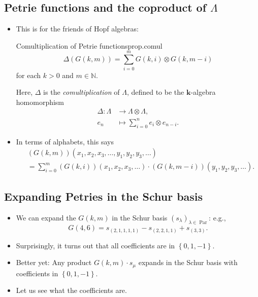 \documentclass[numbers=enddot,12pt,final,onecolumn,notitlepage]{scrartcl}%
\newcommand{\defn}[1]{{\color{darkred}\emph{#1}}}
\newcommand{\0}{\phantom{c}}
\let\sumnonlimits\sum
\renewcommand{\sum}{\sumnonlimits\limits}
\begin{document}
\subsection{Petrie functions and the coproduct of $\Lambda$}

\begin{itemize}
\item This is for the friends of Hopf algebras:%
\begin{proposition}{Comultiplication of Petrie functions}{prop.comul}
\[
\Delta\left(  G\left(  k,m\right)  \right)  =\sum_{i=0}^{m}G\left(
k,i\right)  \otimes G\left(  k,m-i\right)
\]
for each $k>0$ and $m\in\mathbb{N}$.
\end{proposition}

Here, \defn{$\Delta$} is the \defn{comultiplication} of $\Lambda$, defined to
be the $\mathbf{k}$-algebra homomorphism%
\begin{align*}
\Delta:\Lambda &  \rightarrow\Lambda\otimes\Lambda,\\
e_{n}  &  \mapsto\sum_{i=0}^{n}e_{i}\otimes e_{n-i}.
\end{align*}


\item In terms of alphabets, this says%
\begin{align*}
&  \left(  G\left(  k,m\right)  \right)  \left(  x_{1},x_{2},x_{3}%
,\ldots,y_{1},y_{2},y_{3},\ldots\right) \\
&  =\sum_{i=0}^{m}\left(  G\left(  k,i\right)  \right)  \left(  x_{1}%
,x_{2},x_{3},\ldots\right)  \cdot\left(  G\left(  k,m-i\right)  \right)
\left(  y_{1},y_{2},y_{3},\ldots\right)  .
\end{align*}

\end{itemize}

\subsection{Expanding Petries in the Schur basis}

\begin{itemize}
\item We can expand the $G\left(  k,m\right)  $ in the Schur basis $\left(
s_{\lambda}\right)  _{\lambda\in\operatorname*{Par}}$: e.g.,%
\[
G\left(  4,6\right)  =s_{\left(  2,1,1,1,1\right)  }-s_{\left(
2,2,1,1\right)  }+s_{\left(  3,3\right)  }.
\]


\item Surprisingly, it turns out that all coefficients are in $\left\{
0,1,-1\right\}  $.

\item Better yet: Any product $G\left(  k,m\right)  \cdot s_{\mu}$ expands in
the Schur basis with coefficients in $\left\{  0,1,-1\right\}  $.

\item Let us see what the coefficients are.
\end{itemize}
\end{document}
